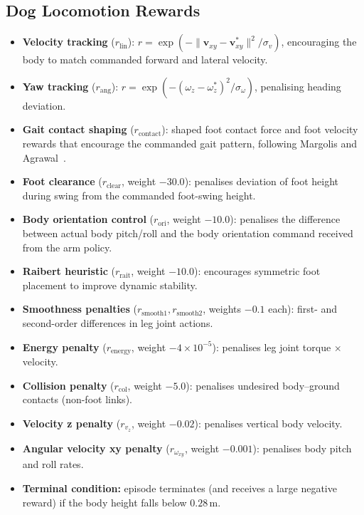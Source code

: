 \subsection{Dog Locomotion Rewards}

\begin{itemize}
  \item \textbf{Velocity tracking} ($r_{\text{lin}}$):
        $r = \exp(-\|\mathbf{v}_{xy} - \mathbf{v}^*_{xy}\|^2 / \sigma_v)$,
        encouraging the body to match commanded forward and lateral velocity.
  \item \textbf{Yaw tracking} ($r_{\text{ang}}$):
        $r = \exp(-(\omega_z - \omega_z^*)^2 / \sigma_\omega)$,
        penalising heading deviation.
  \item \textbf{Gait contact shaping} ($r_{\text{contact}}$):
        shaped foot contact force and foot velocity rewards that encourage
        the commanded gait pattern, following Margolis and
        Agrawal~\cite{margolis2022walk}.
  \item \textbf{Foot clearance} ($r_{\text{clear}}$, weight $-30.0$):
        penalises deviation of foot height during swing from the commanded
        foot-swing height.
  \item \textbf{Body orientation control} ($r_{\text{ori}}$, weight $-10.0$):
        penalises the difference between actual body pitch/roll and the
        body orientation command received from the arm policy.
  \item \textbf{Raibert heuristic} ($r_{\text{rait}}$, weight $-10.0$):
        encourages symmetric foot placement to improve dynamic stability.
  \item \textbf{Smoothness penalties} ($r_{\text{smooth1}}, r_{\text{smooth2}}$,
        weights $-0.1$ each): first- and second-order differences in
        leg joint actions.
  \item \textbf{Energy penalty} ($r_{\text{energy}}$, weight $-4 \times 10^{-5}$):
        penalises leg joint torque $\times$ velocity.
  \item \textbf{Collision penalty} ($r_{\text{col}}$, weight $-5.0$):
        penalises undesired body--ground contacts (non-foot links).
  \item \textbf{Velocity z penalty} ($r_{v_z}$, weight $-0.02$):
        penalises vertical body velocity.
  \item \textbf{Angular velocity xy penalty} ($r_{\omega_{xy}}$, weight $-0.001$):
        penalises body pitch and roll rates.
  \item \textbf{Terminal condition:} episode terminates (and receives
        a large negative reward) if the body height falls below $0.28$\,m.
\end{itemize}

